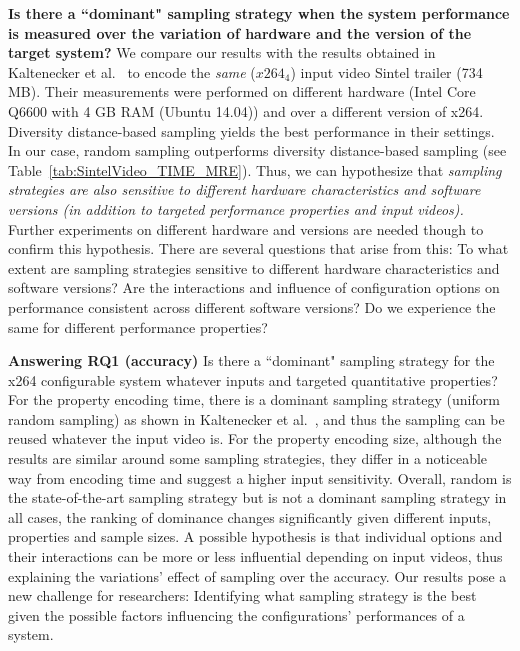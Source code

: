 

\textbf{Is there a ``dominant" sampling strategy when the system performance is measured over the variation of hardware and the version of the target system?}
We compare our results with the results obtained in Kaltenecker et al.~\cite{kaltenecker2019} to encode the \textit{same} ($x264_4$) input video Sintel trailer (734 MB).
Their measurements were performed on different hardware (Intel Core Q6600 with 4 GB RAM (Ubuntu 14.04)) and over a different version of x264.  
Diversity distance-based sampling yields the best performance in their settings. In our case, random sampling outperforms diversity distance-based sampling (see Table~\ref{tab:SintelVideo_TIME_MRE}).
Thus, we can hypothesize that \textit{sampling strategies are also sensitive to different hardware characteristics and software versions (in addition to targeted performance properties and input videos).} 
Further experiments on different hardware and versions are needed though to confirm this hypothesis.
There are several questions that arise from this:
To what extent are sampling strategies sensitive to different hardware characteristics and software versions? Are the interactions and influence of configuration options on performance consistent across different software versions? Do we experience the same for different performance properties? 
 





\textbf{Answering RQ1 (accuracy)} Is there a ``dominant" sampling strategy for the x264 configurable system whatever inputs and targeted quantitative properties?
For the property encoding time, there is a dominant sampling strategy (\ie uniform random sampling) as shown in Kaltenecker et al.~\cite{kaltenecker2019}, and thus the sampling can be reused whatever the input video is.
For the property encoding size, although the results are similar around some sampling strategies, they differ in a noticeable way from encoding time and suggest a higher input sensitivity.
Overall, random is the state-of-the-art sampling strategy but is not a dominant sampling strategy in all cases, \ie the ranking of dominance changes significantly given different inputs, properties and sample sizes.
A possible hypothesis is that individual options and their interactions can be more or less influential depending on input videos, thus explaining the variations' effect of sampling over the accuracy. Our results pose a new challenge for researchers: Identifying what sampling strategy is the best given the possible factors influencing the configurations' performances of a system.


